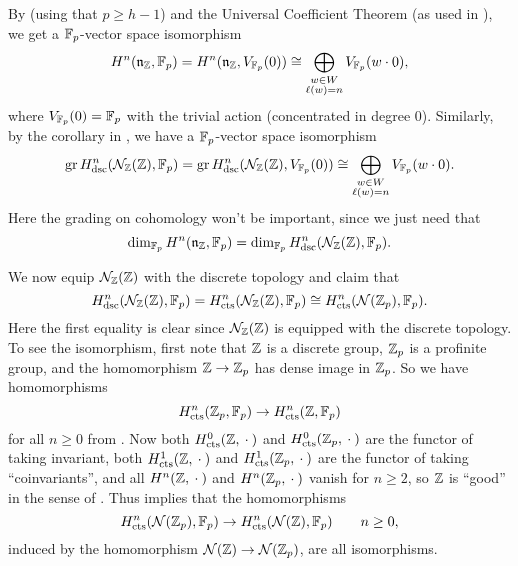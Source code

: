 By \cite[§2.10]{PT} (using that $p \geq h-1$) and the Universal Coefficient Theorem (as used in \cite[§3.8]{PT}), we get a $\mathbb{F}_{p}$-vector space isomorphism
\begin{equation*}
  H^{n}(\mathfrak{n}_{\mathbb{Z}},\mathbb{F}_{p}) = H^{n}(\mathfrak{n}_{\mathbb{Z}},V_{\mathbb{F}_p}(0)) \cong \bigoplus_{\substack{w \in W \\ \ell(w) = n}} V_{\mathbb{F}_p}(w \cdot 0),
\end{equation*}
where $V_{\mathbb{F}_{p}}(0) = \mathbb{F}_{p}$ with the trivial action (concentrated in degree $0$). Similarly, by the corollary in \cite[§3.8]{PT}, we have a $\mathbb{F}_{p}$-vector space isomorphism
\begin{equation*}
  \operatorname{gr} H_{\mathrm{dsc}}^{n}(\mathcal{N}_{\mathbb{Z}}(\mathbb{Z}),\mathbb{F}_{p}) = \operatorname{gr} H_{\mathrm{dsc}}^{n}(\mathcal{N}_{\mathbb{Z}}(\mathbb{Z}),V_{\mathbb{F}_p}(0)) \cong \bigoplus_{\substack{w \in W \\ \ell(w) = n}} V_{\mathbb{F}_p}(w \cdot 0).
\end{equation*}
Here the grading on cohomology won't be important, since we just need that
\begin{equation}
  \label{eq:PT-dims}
  \dim_{\mathbb{F}_{p}} H^{n}(\mathfrak{n}_{\mathbb{Z}},\mathbb{F}_{p}) = \dim_{\mathbb{F}_{p}} H_{\mathrm{dsc}}^{n}(\mathcal{N}_{\mathbb{Z}}(\mathbb{Z}),\mathbb{F}_{p}).
\end{equation}

We now equip $\mathcal{N}_{\mathbb{Z}}(\mathbb{Z})$ with the discrete topology and claim that
\begin{equation*}
  H_{\mathrm{dsc}}^{n}(\mathcal{N}_{\mathbb{Z}}(\mathbb{Z}),\mathbb{F}_{p}) = H_{\mathrm{cts}}^{n}(\mathcal{N}_{\mathbb{Z}}(\mathbb{Z}),\mathbb{F}_{p}) \cong H_{\mathrm{cts}}^{n}(\mathcal{N}(\mathbb{Z}_p),\mathbb{F}_{p}).
\end{equation*}
Here the first equality is clear since $\mathcal{N}_{\mathbb{Z}}(\mathbb{Z})$ is equipped with the discrete topology. To see the isomorphism, first note that $\mathbb{Z}$ is a discrete group, $\mathbb{Z}_p$ is a profinite group, and the homomorphism $\mathbb{Z} \to \mathbb{Z}_p$ has dense image in $\mathbb{Z}_p$. So we have homomorphisms
\begin{equation*}
  H_{\mathrm{cts}}^n(\mathbb{Z}_p,\mathbb{F}_p) \to H_{\mathrm{cts}}^n(\mathbb{Z},\mathbb{F}_p)
\end{equation*}
for all $n\geq0$ from \cite[Sect.~I~§2.6]{GalCoh}. Now both $H_{\mathrm{cts}}^0(\mathbb{Z},\:\cdot\:)$ and $H_{\mathrm{cts}}^0(\mathbb{Z}_p,\:\cdot\:)$ are the functor of taking invariant, both $H_{\mathrm{cts}}^1(\mathbb{Z},\:\cdot\:)$ and $H_{\mathrm{cts}}^1(\mathbb{Z}_p,\:\cdot\:)$ are the functor of taking ``coinvariants'', and all $H^n(\mathbb{Z},\:\cdot\:)$ and $H^n(\mathbb{Z}_p,\:\cdot\:)$ vanish for $n\geq2$, so $\mathbb{Z}$ is \enquote{good} in the sense of \cite[Section~I~§2.6 Exercise~2]{GalCoh}. Thus \cite[Section~I~§2.6 Exercise~2(d)]{GalCoh} implies that the homomorphisms
\begin{equation*}
  H_{\mathrm{cts}}^n(\mathcal{N}(\mathbb{Z}_p),\mathbb{F}_p) \to H_{\mathrm{cts}}^n(\mathcal{N}(\mathbb{Z}),\mathbb{F}_p) \qquad n\geq0,
\end{equation*}
induced by the homomorphism $\mathcal{N}(\mathbb{Z}) \to \mathcal{N}(\mathbb{Z}_p)$, are all isomorphisms.

